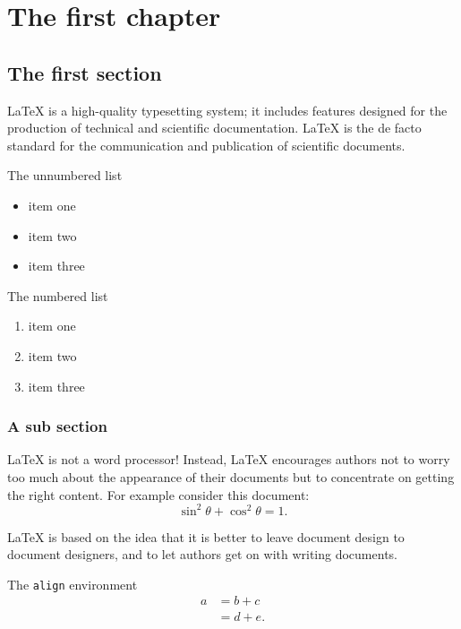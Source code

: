 \documentclass[openany,twoside,12pt]{book}
\theoremstyle{plain}
\numberwithin{equation}{chapter}
\numberwithin{figure}{chapter}
\numberwithin{table}{chapter}
\begin{document}

\mainmatter



\chapter{The first chapter}

\section{The first section}\label{my label}
LaTeX is a high-quality typesetting system; it includes features designed for the production of technical and scientific documentation. LaTeX is the de facto standard for the communication and publication of scientific documents.

The unnumbered list
\begin{itemize}
  \item item one
  \item item two
  \item item three
\end{itemize}

The numbered list
\begin{enumerate}
  \item item one
  \item item two
  \item item three
\end{enumerate}

\subsection{A sub section}
LaTeX is not a word processor! Instead, LaTeX encourages authors not to worry too much about the appearance of their documents but to concentrate on getting the right content. For example consider this document:
\begin{equation}\label{eqn:trifun}
\sin^2{\theta}+\cos^2{\theta}=1.
\end{equation}

LaTeX is based on the idea that it is better to leave document design to document designers, and to let authors get on with writing documents.

The \texttt{align} environment
\begin{align}
a & = b + c \\
& = d + e.
\end{align}
\end{document}
